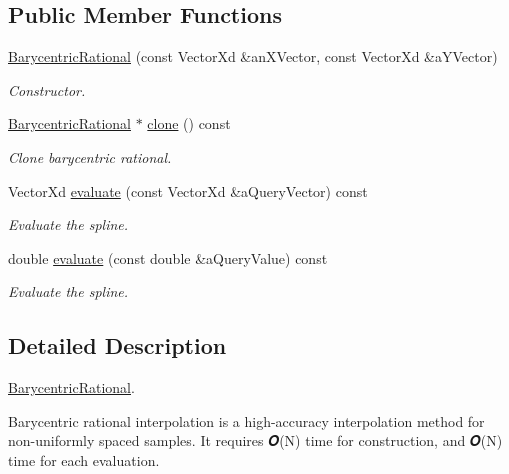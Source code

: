 \subsection*{Public Member Functions}
\begin{DoxyCompactItemize}
\item 
\hyperlink{classostk_1_1math_1_1curvefitting_1_1interp_1_1_barycentric_rational_a89d1e68b0fc999851908b1b7228419a1}{Barycentric\+Rational} (const Vector\+Xd \&an\+X\+Vector, const Vector\+Xd \&a\+Y\+Vector)
\begin{DoxyCompactList}\small\item\em Constructor. \end{DoxyCompactList}\item 
\hyperlink{classostk_1_1math_1_1curvefitting_1_1interp_1_1_barycentric_rational}{Barycentric\+Rational} $\ast$ \hyperlink{classostk_1_1math_1_1curvefitting_1_1interp_1_1_barycentric_rational_a0fe27c0d93f957df0132354daa3e1368}{clone} () const
\begin{DoxyCompactList}\small\item\em Clone barycentric rational. \end{DoxyCompactList}\item 
Vector\+Xd \hyperlink{classostk_1_1math_1_1curvefitting_1_1interp_1_1_barycentric_rational_a4fbf8e51d6c5c383dca899b3e06fe043}{evaluate} (const Vector\+Xd \&a\+Query\+Vector) const
\begin{DoxyCompactList}\small\item\em Evaluate the spline. \end{DoxyCompactList}\item 
double \hyperlink{classostk_1_1math_1_1curvefitting_1_1interp_1_1_barycentric_rational_ac4924f9afb399ee21f12f2d9bf381da1}{evaluate} (const double \&a\+Query\+Value) const
\begin{DoxyCompactList}\small\item\em Evaluate the spline. \end{DoxyCompactList}\end{DoxyCompactItemize}


\subsection{Detailed Description}
\hyperlink{classostk_1_1math_1_1curvefitting_1_1interp_1_1_barycentric_rational}{Barycentric\+Rational}. 

Barycentric rational interpolation is a high-\/accuracy interpolation method for non-\/uniformly spaced samples. It requires 𝑶(\+N) time for construction, and 𝑶(\+N) time for each evaluation.

